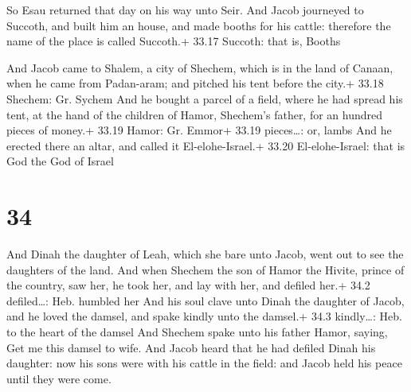  So Esau returned that day on his way unto Seir.
 And Jacob journeyed to Succoth, and built him an house,
and made booths for his cattle: therefore the name of the place is
called Succoth.+ 33.17 Succoth: that is, Booths

 And Jacob came to Shalem, a city of Shechem, which is in
the land of Canaan, when he came from Padan-aram; and pitched his tent
before the city.+ 33.18 Shechem: Gr. Sychem  And he bought
a parcel of a field, where he had spread his tent, at the hand of the
children of Hamor, Shechem's father, for an hundred pieces of money.+
33.19 Hamor: Gr. Emmor+ 33.19 pieces\ldots: or, lambs  And
he erected there an altar, and called it El-elohe-Israel.+ 33.20
El-elohe-Israel: that is God the God of Israel

\hypertarget{section-33}{%
\section{34}\label{section-33}}

 And Dinah the daughter of Leah, which she bare unto Jacob,
went out to see the daughters of the land.  And when Shechem
the son of Hamor the Hivite, prince of the country, saw her, he took
her, and lay with her, and defiled her.+ 34.2 defiled\ldots: Heb.
humbled her  And his soul clave unto Dinah the daughter of
Jacob, and he loved the damsel, and spake kindly unto the damsel.+ 34.3
kindly\ldots: Heb. to the heart of the damsel  And Shechem
spake unto his father Hamor, saying, Get me this damsel to wife.
 And Jacob heard that he had defiled Dinah his daughter: now
his sons were with his cattle in the field: and Jacob held his peace
until they were come.

